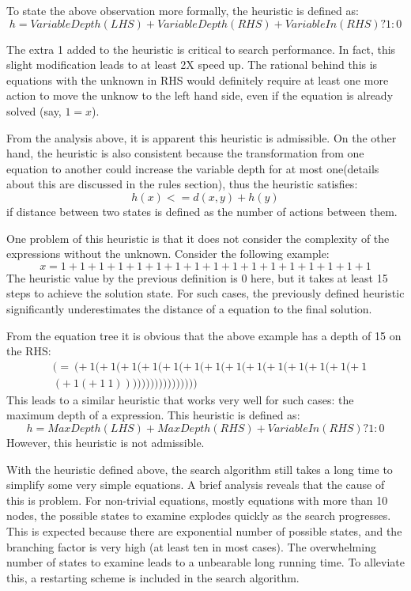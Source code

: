 \documentclass{article}
\begin{document}
To state the above observation more formally, the heuristic is defined as:
\[ h = VariableDepth(LHS) + VariableDepth(RHS) + VariableIn(RHS)?1:0 \]

The extra 1 added to the heuristic is critical to search performance. In fact, this slight modification leads to at least 2X speed up. The rational behind this is equations with the unknown in RHS would definitely require at least one more action to move the unknow to the left hand side, even if the equation is already solved (say, $1=x$). 

From the analysis above, it is apparent this heuristic is admissible. On the other hand, the heuristic is also consistent because the transformation from one equation to another could increase the variable depth for at most one(details about this are discussed in the rules section), thus the heuristic satisfies:
\[ h(x) <= d(x, y) + h(y) \]
if distance between two states is defined as the number of actions between them.

One problem of this heuristic is that it does not consider the complexity of the expressions without the unknown. Consider the following example:
\[ x = 1 + 1 + 1 + 1 + 1 + 1 + 1 + 1 + 1 + 1 + 1 + 1 + 1 + 1 + 1 + 1 + 1 \]
The heuristic value by the previous definition is 0 here, but it takes at least 15 steps to achieve the solution state. For such cases, the previously defined heuristic significantly underestimates the distance of a equation to the final solution. 

From the equation tree it is obvious that the above example has a depth of 15 on the RHS:
\[ 
\begin{split}
&(=~(+~1(+~1(+~1(+~1(+~1(+~1(+~1(+~1(+~1(+~1(+~1(+~1(+~1(+~1\\
&(+~1(+~1~1)))))))))))))))))
\end{split} \]
This leads to a similar heuristic that works very well for such cases: the maximum depth of a expression. This heuristic is defined as:
\[ h = MaxDepth(LHS) + MaxDepth(RHS) + VariableIn(RHS)?1:0 \]
However, this heuristic is not admissible.

\bigbreak
\bigbreak
With the heuristic defined above, the search algorithm still takes a long time to simplify some very simple equations. A brief analysis reveals that the cause of this is problem. For non-trivial equations, mostly equations with more than 10 nodes, the possible states to examine explodes quickly as the search progresses. This is expected because there are exponential number of possible states, and the branching factor is very high (at least ten in most cases). The overwhelming number of states to examine leads to a unbearable long running time. To alleviate this, a restarting scheme is included in the search algorithm.
\end{document}
